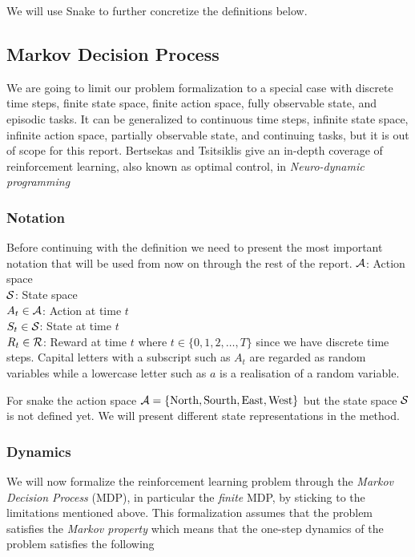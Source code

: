 \documentclass[result.tex]{subfiles}
\begin{document}
    We will use Snake to further concretize the definitions below.

    \subsection*{Markov Decision Process}

    We are going to limit our problem formalization to a special case with discrete time steps, finite state space, finite action space, fully observable state, and episodic tasks. It can be generalized to continuous time steps, infinite state space, infinite action space, partially observable state, and continuing tasks, but it is out of scope for this report. Bertsekas and Tsitsiklis give an in-depth coverage of reinforcement learning, also known as optimal control, in \textit{Neuro-dynamic programming} \cite{bertsekas1995neuro}

    \subsubsection*{Notation}

    Before continuing with the definition we need to present the most important notation that will be used from now on through the rest of the report.
    \newline
    $\mathcal{A}$: Action space \\
    $\mathcal{S}$: State space \\
    $A_t \in \mathcal{A}$: Action at time $t$ \\
    $S_t \in \mathcal{S}$: State at time $t$ \\
    $R_t \in \mathcal{R}$: Reward at time $t$
    \newline
    where $t \in \{ 0, 1, 2, \ldots, T \}$ since we have discrete time steps. Capital letters with a subscript such as $A_t$ are regarded as random variables while a lowercase letter such as $a$ is a realisation of a random variable.

    For snake the action space $\mathcal{A} = \{ \text{North}, \text{Sourth}, \text{East}, \text{West} \}$ but the state space $\mathcal{S}$ is not defined yet. We will present different state representations in the method.

    \subsubsection*{Dynamics}

    We will now formalize the reinforcement learning problem through the \textit{Markov Decision Process} (MDP), in particular the \textit{finite} MDP, by sticking to the limitations mentioned above. This formalization assumes that the problem satisfies the \textit{Markov property} which means that the one-step dynamics of the problem satisfies the following
\end{document}
